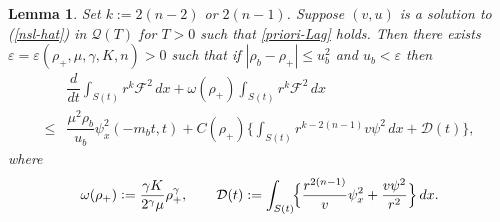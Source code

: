 \documentclass[a4paper,12pt,draft]{article}
\newtheorem{lemma}[theorem]{Lemma}
\theoremstyle{remark}
\def\ep{\varepsilon}
\def\mD{\mathcal{D}}
\def\mF{\mathcal{F}}
\def\mQ{\mathcal{Q}}
\begin{document}
\begin{lemma}\label{lemma:Hx}
Set $k:= 2(n-2)$ or $2(n-1)$. Suppose $(v,u)$ is a solution to (\ref{nsl-hat}) in $\mQ(T)$ for $T>0$ such that \eqref{priori-Lag} holds. Then there exists $\ep=\ep(\rho_+,\mu,\gamma,K,n)>0$ such that if $|\rho_b-\rho_+|\le u_b^2$ and $u_b< \ep$ then
\begin{align*}
    &\dfrac{d }{d t} \int_{S(t)}\!\! r^k \mF^2\, d x + \omega(\rho_+)\int_{S(t)}\!\! r^{k}\mF^2 \, d x \\
    \le &  \dfrac{\mu^2 \rho_b}{u_b} \psi_x^2(-m_b t,t) + C(\rho_+)\bigg\{\int_{S(t)} r^{k-2(n-1)} v\psi^2 \, dx + \mD(t)\bigg\}, 
\end{align*}
where
\begin{equation}
	\omega(\rho_{+}) \vcentcolon= \frac{\gamma K }{2^{\gamma}\mu} \rho_+^{\gamma}, \qquad \mD(t):= \int_{S(t)}\!\! \Big\{ \dfrac{r^{2(n-1)}}{v}\psi_x^2 + \dfrac{v \psi^2 }{r^2} \Big\}\, dx .  \label{mD}
\end{equation}
\end{lemma}
\end{document}
